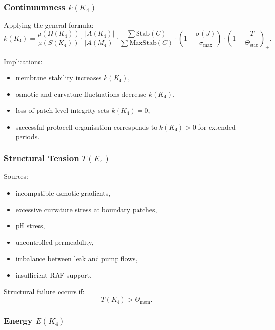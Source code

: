 \subsubsection{Continuumness \texorpdfstring{$k(K_4)$}{k(K_4)}}

Applying the general formula:
\[
k(K_4) =
\frac{\mu(\Omega(K_4))}{\mu(S(K_4))}
\cdot
\frac{|A(K_4)|}{|A(M_4)|}
\cdot
\frac{\sum \mathrm{Stab}(C)}{\sum \mathrm{MaxStab}(C)}
\cdot
(1 - \frac{\sigma(J)}{\sigma_{\max}})
\cdot
(1 - \frac{T}{\Theta_{\mathrm{stab}}})_+.
\]

Implications:
\begin{itemize}
    \item membrane stability increases $k(K_4)$,
    \item osmotic and curvature fluctuations decrease $k(K_4)$,
    \item loss of patch-level integrity sets $k(K_4)=0$,
    \item successful protocell organisation corresponds to
          $k(K_4)>0$ for extended periods.
\end{itemize}

\subsubsection{Structural Tension \texorpdfstring{$T(K_4)$}{T(K_4)}}

Sources:
\begin{itemize}
    \item incompatible osmotic gradients,
    \item excessive curvature stress at boundary patches,
    \item pH stress,
    \item uncontrolled permeability,
    \item imbalance between leak and pump flows,
    \item insufficient RAF support.
\end{itemize}

Structural failure occurs if:
\[
T(K_4) > \Theta_{\mathrm{mem}}.
\]

\subsubsection{Energy \texorpdfstring{$E(K_4)$}{E(K_4)}}

